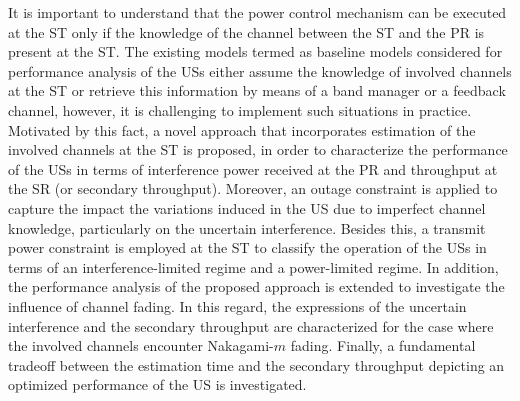 It is important to understand that the power control mechanism can be executed at the ST only if the knowledge of the channel between the ST and the PR is present at the ST. The existing models termed as baseline models considered for performance analysis of the USs either assume the knowledge of involved channels at the ST or retrieve this information by means of a band manager or a feedback channel, however, it is challenging to implement such situations in practice. Motivated by this fact, a novel approach that incorporates estimation of the involved channels at the ST is proposed, in order to characterize the performance of the USs in terms of interference power received at the PR and throughput at the SR (or secondary throughput). Moreover, an outage constraint is applied to capture the impact the variations induced in the US due to imperfect channel knowledge, particularly on the uncertain interference. 
Besides this, a transmit power constraint is employed at the ST to classify the operation of the USs in terms of an interference-limited regime and a power-limited regime. In addition, the performance analysis of the proposed approach is extended to investigate the influence of channel fading. In this regard, the expressions of the uncertain interference and the secondary throughput are characterized for the case where the involved channels encounter Nakagami-$m$ fading. Finally, a fundamental tradeoff between the estimation time and the secondary throughput depicting an optimized performance of the US is investigated. 

